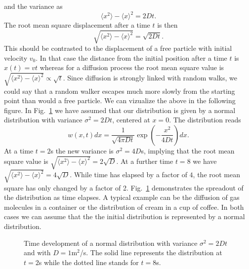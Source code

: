 and the variance as 
\begin{equation}\label{eq:variancediffeq}
   \langle x^2\rangle-\langle x\rangle^2 = 2Dt.
 \end{equation}
The root mean square displacement after a time $t$ is then 
\[
   \sqrt{\langle x^2\rangle-\langle x\rangle^2} = \sqrt{2Dt}.
 \]
This should be contrasted to the displacement of a free particle with initial velocity
$v_0$. In that case the distance from the initial position after a time $t$ is
$x(t) = vt$ whereas for a diffusion process the root mean square value is 
$\sqrt{\langle x^2\rangle-\langle x\rangle^2} \propto \sqrt{t}$.
Since diffusion is strongly linked with random walks, we could say that a random walker
escapes much more slowly from the starting point than would a free particle.
We can vizualize the above in the following figure.
In Fig.~\ref{fig:normal_distribution} we have assumed that our distribution is
given by a normal distribution with variance $\sigma^2=2Dt$, centered at $x=0$. 
The distribution reads
\[
    w(x,t)dx = \frac{1}{\sqrt{4\pi Dt}}\exp{(-\frac{x^2}{4Dt})}dx.
\]
At a time $t=2$s the new variance is $\sigma^2=4D$s, implying that the root mean square value
is $\sqrt{\langle x^2\rangle-\langle x\rangle^2} = 2\sqrt{D}$.
At a further time $t=8$ we have $\sqrt{\langle x^2\rangle-\langle x\rangle^2} = 4\sqrt{D}$.
While time has elapsed by a factor of $4$, the root mean square has only changed by a factor
of 2. 
Fig.~\ref{fig:normal_distribution} demonstrates the spreadout of the distribution as time elapses.
A typical example can be the diffusion of gas molecules in a container or the distribution of cream in a cup of coffee. In both cases we can assume that the  
the initial distribution is represented by a normal distribution.
\begin{figure}
\begin{center}

\caption{Time development of a normal distribution with variance $\sigma^2=2Dt$ and with 
$D=1$m$^2$/s. The solid line
represents the distribution at $t=2$s while the dotted line stands for $t=8$s.\label{fig:normal_distribution}}
\end{center}
\end{figure}
